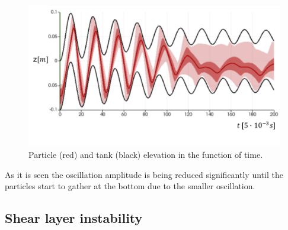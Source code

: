 \documentclass[a4paper,12pt,openany]{book}
\theoremstyle{break}
\begin{document}
\begin{figure}[h!]
  \includegraphics[scale=0.6]{particle_damper_time_series.pdf}
  \centering
  \caption{Particle (red) and tank (black) elevation in the function of time.}
  \label{fig:particle_damper_geom}
\end{figure}\vspace*{3pt}
As it is seen the oscillation amplitude is being reduced significantly until the particles start to gather at the bottom due to the smaller oscillation.


\subsection{Shear layer instability}
\end{document}
